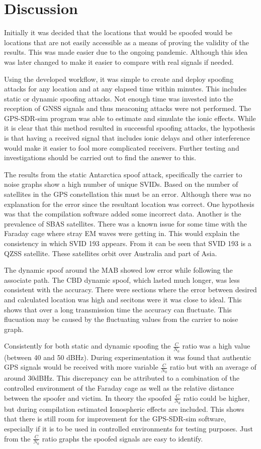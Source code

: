 \section{Discussion}
Initially it was decided that the locations that would be spoofed would be locations that are not easily accessible as a means of proving the validity of the results.
This was made easier due to the ongoing pandemic. Although this idea was later changed to make it easier to compare with real signals if needed.

Using the developed workflow, it was simple to create and deploy spoofing attacks for any location and at any elapsed time within minutes. This includes static or dynamic
spoofing attacks. Not enough time was invested into the reception of GNSS signals and thus meaconing attacks were not performed. The GPS-SDR-sim program was able to
estimate and simulate the ionic effects. While it is clear that this method resulted in successful spoofing attacks, the hypothesis is that having a received signal that includes ionic delays
and other interference would make it easier to fool more complicated receivers. Further testing and investigations should be carried out to find the answer to this. 

The results from the static Antarctica spoof attack, specifically the carrier to noise graphs show a high number of unique SVIDs. Based on the number of satellites in the
GPS constellation this must be an error. Although there was no explanation for the error since the resultant location was correct. One hypothesis was that the compilation
software added some incorrect data. Another is the prevalence of SBAS satellites. There was a known issue for some time with the Faraday cage where stray EM waves were
getting in. This would explain the consistency in which SVID 193 appears. From \cite{RN67} it can be seen that SVID 193 is a QZSS satellite. These satellites orbit over
Australia and part of Asia.

The dynamic spoof around the MAB showed low error while following the associate path. The CBD dynamic spoof, which lasted much longer, was less consistent with the
accuracy. There were sections where the error between desired and calculated location was high and secitons were it was close to ideal. This shows that over a long
transmission time the accuracy can fluctuate. This flucuation may be caused by the fluctuating values from the carrier to noise graph.

Consistently for both static and dynamic spoofing the $\frac{C}{N_0}$ ratio was a high value (between 40 and 50 dBHz). During experimentation it was found that authentic
GPS signals would be received with more variable $\frac{C}{N_0}$ ratio but with an average of around 30dBHz. This discrepancy can be attributed to a combination of the
controlled environment of the Faraday cage as well as the relative distance between the spoofer and victim. In theory the spoofed $\frac{C}{N_0}$ ratio could be higher,
but during compilation estimated Ionospheric effects are included. This shows that there is still room for improvement for the GPS-SDR-sim software, especially if it is
to be used in controlled environments for testing purposes. Just from the $\frac{C}{N_0}$ ratio graphs the spoofed signals are easy to identify.

